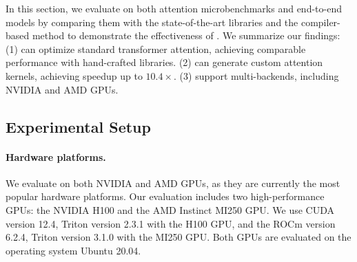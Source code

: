 In this section, we evaluate \oursys{} on both attention microbenchmarks and end-to-end models by comparing them with the
state-of-the-art libraries and the compiler-based method to demonstrate the effectiveness of \oursys{}.
We summarize our findings: (1) \oursys{} can optimize standard transformer attention, achieving comparable performance with hand-crafted libraries. (2) \oursys{} can generate custom attention kernels, achieving speedup up to $10.4\times$. (3) \oursys{} support multi-backends, including NVIDIA and AMD GPUs.

\subsection{Experimental Setup}

\paragraph{Hardware platforms.} We evaluate \oursys{} on both NVIDIA and AMD GPUs, as they are currently the most popular hardware platforms. Our evaluation includes two high-performance GPUs: the NVIDIA H100 and the AMD Instinct MI250 GPU. 
We use CUDA version 12.4, Triton version 2.3.1 with the H100 GPU, and the ROCm version 6.2.4, Triton version 3.1.0 with the MI250 GPU. Both GPUs are evaluated on the operating system Ubuntu 20.04.

